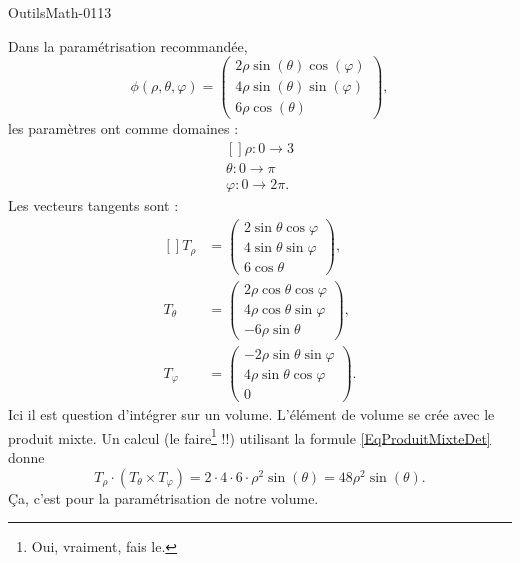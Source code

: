 
\begin{corrige}{OutilsMath-0113}

    Dans la paramétrisation recommandée,
    \begin{equation}
        \phi(\rho,\theta,\varphi)=\begin{pmatrix}
            2\rho\sin(\theta)\cos(\varphi)    \\ 
            4\rho\sin(\theta)\sin(\varphi)    \\ 
            6\rho\cos(\theta)    
        \end{pmatrix},
    \end{equation}
    les paramètres ont comme domaines :
    \begin{equation}
        \begin{aligned}[]
            \rho\colon 0\to 3\\
            \theta\colon 0\to \pi\\
            \varphi\colon 0\to 2\pi.
        \end{aligned}
    \end{equation}
    Les vecteurs tangents sont :
    \begin{equation}
        \begin{aligned}[]
            T_{\rho}&=\begin{pmatrix}
                2\sin\theta\cos\varphi    \\ 
                4\sin\theta\sin\varphi    \\ 
                6\cos\theta    
            \end{pmatrix},\\
            T_{\theta}&=\begin{pmatrix}
                2\rho\cos\theta\cos\varphi    \\ 
                4\rho\cos\theta\sin\varphi    \\ 
                -6\rho\sin\theta    
            \end{pmatrix},\\
            T_{\varphi}&=\begin{pmatrix}
                -2\rho\sin\theta\sin\varphi    \\ 
                4\rho\sin\theta\cos\varphi    \\ 
                0    
            \end{pmatrix}.
        \end{aligned}
    \end{equation}
    Ici il est question d'intégrer sur un volume. L'élément de volume se crée avec le produit mixte. Un calcul (le faire\footnote{Oui, vraiment, fais le.} !!) utilisant la formule \eqref{EqProduitMixteDet} donne
    \begin{equation}
        T_{\rho}\cdot(T_{\theta}\times T_{\varphi})=2\cdot 4\cdot 6\cdot\rho^2\sin(\theta)=48\rho^2\sin(\theta).
    \end{equation}
    Ça, c'est pour la paramétrisation de notre volume.


\end{corrige}
